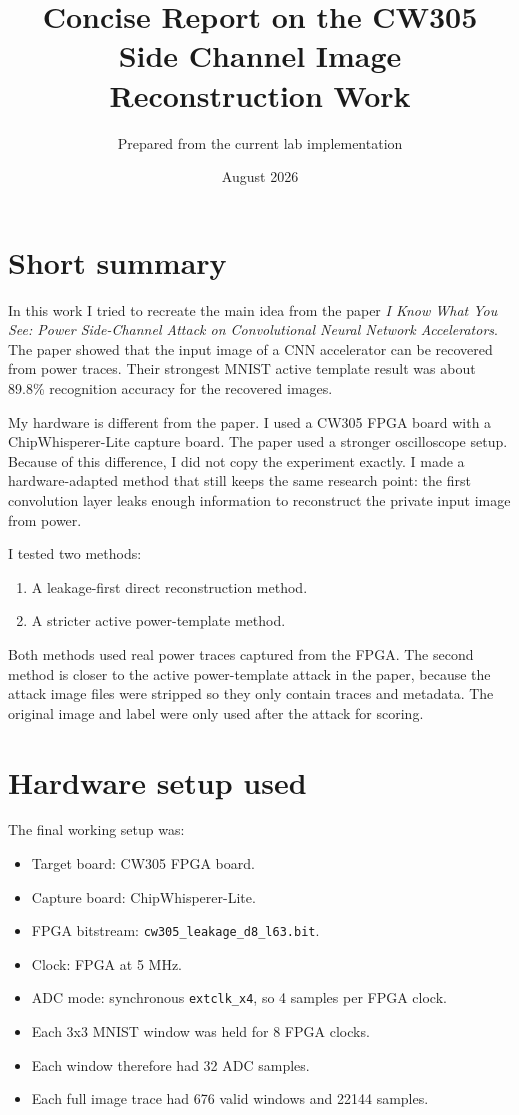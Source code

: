 \documentclass[11pt]{article}
\title{Concise Report on the CW305 Side Channel Image Reconstruction Work}
\author{Prepared from the current lab implementation}
\date{August 2026}
\begin{document}
\maketitle

\section*{Short summary}

In this work I tried to recreate the main idea from the paper
\emph{I Know What You See: Power Side-Channel Attack on Convolutional Neural
Network Accelerators}. The paper showed that the input image of a CNN accelerator
can be recovered from power traces. Their strongest MNIST active template result
was about 89.8\% recognition accuracy for the recovered images.

My hardware is different from the paper. I used a CW305 FPGA board with a
ChipWhisperer-Lite capture board. The paper used a stronger oscilloscope setup.
Because of this difference, I did not copy the experiment exactly. I made a
hardware-adapted method that still keeps the same research point: the first
convolution layer leaks enough information to reconstruct the private input
image from power.

I tested two methods:

\begin{enumerate}
  \item A leakage-first direct reconstruction method.
  \item A stricter active power-template method.
\end{enumerate}

Both methods used real power traces captured from the FPGA. The second method is
closer to the active power-template attack in the paper, because the attack
image files were stripped so they only contain traces and metadata. The original
image and label were only used after the attack for scoring.

\section*{Hardware setup used}

The final working setup was:

\begin{itemize}
  \item Target board: CW305 FPGA board.
  \item Capture board: ChipWhisperer-Lite.
  \item FPGA bitstream: \texttt{cw305\_leakage\_d8\_l63.bit}.
  \item Clock: FPGA at 5 MHz.
  \item ADC mode: synchronous \texttt{extclk\_x4}, so 4 samples per FPGA clock.
  \item Each 3x3 MNIST window was held for 8 FPGA clocks.
  \item Each window therefore had 32 ADC samples.
  \item Each full image trace had 676 valid windows and 22144 samples.
\end{itemize}
\end{document}
